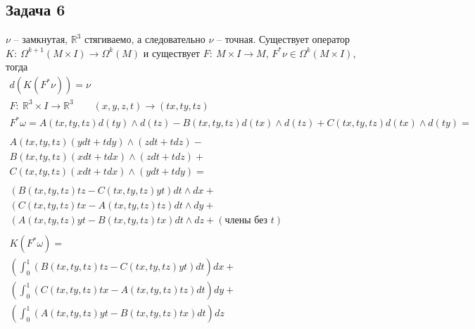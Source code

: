 \subsection*{Задача 6}
	$\nu$ -- замкнутая, $\mathbb{R}^3$ стягиваемо, а следовательно $\nu$ -- точная. Существует оператор $K:\ \Omega^{k+1} (M \times I) \to \Omega^{k} (M)$ и существует $F:\ M \times I \to M$, $F^{*} \nu \in \Omega^{k} (M \times I)$, тогда
	\begin{gather*}
	d(K(F^{*} \nu)) = \nu\\
	F:\ \mathbb{R}^3 \times I \to \mathbb{R}^3\qquad (x,y,z,t) \to (tx,ty,tz)\\
	F^{*} \omega =
	A\left(tx,ty,tz\right) d\left(ty\right) \wedge d\left(tz\right) - B\left(tx,ty,tz\right) d\left(tx\right) \wedge d\left(tz\right) + C\left(tx,ty,tz\right) d\left(tx\right) \wedge d\left(ty\right) =\\
	\\
	A\left(tx,ty,tz\right) \left(ydt + tdy\right) \wedge \left(zdt + tdz\right) -\\
	B\left(tx,ty,tz\right) \left(xdt + tdx\right) \wedge \left(zdt + tdz\right) +\\
	C\left(tx,ty,tz\right) \left(xdt + tdx\right) \wedge \left(ydt + tdy\right) =\\
	\\
	\left(B\left(tx,ty,tz\right) tz - C\left(tx,ty,tz\right) yt\right) dt \wedge dx +\\
	\left(C\left(tx,ty,tz\right) tx - A\left(tx,ty,tz\right) tz\right) dt \wedge dy +\\
	\left(A\left(tx,ty,tz\right) yt - B\left(tx,ty,tz\right) tx\right) dt \wedge dz +
	\left(\text{члены без } t\right)\\
	\\
	K\left(F^{*} \omega\right) =\\ 
	\left(\int_{0}^{1} \left(B\left(tx,ty,tz\right) tz - C\left(tx,ty,tz\right) yt\right) dt\right) dx +\\
	\left(\int_{0}^{1} \left(C\left(tx,ty,tz\right) tx - A\left(tx,ty,tz\right) tz\right) dt\right) dy +\\
	\left(\int_{0}^{1} \left(A\left(tx,ty,tz\right) yt - B\left(tx,ty,tz\right) tx\right) dt\right) dz
	\end{gather*}
\vskip 0.4in
